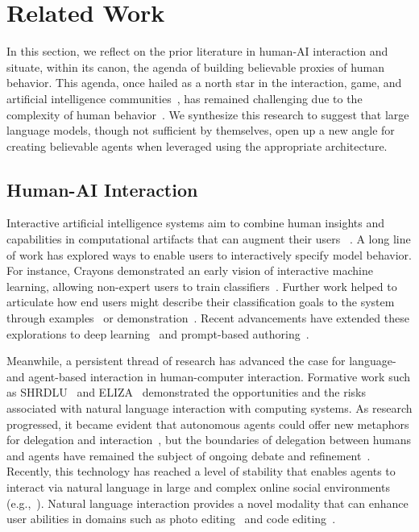 \section{Related Work}
In this section, we reflect on the prior literature in human-AI interaction and situate, within its canon, the agenda of building believable proxies of human behavior. This agenda, once hailed as a north star in the interaction, game, and artificial intelligence communities~\cite{4_laird2001human, 6_riedl2012interactive, 21_riedl2005objective, 22_bates1994role}, has remained challenging due to the complexity of human behavior~\cite{23_brooks2000cog, 25_yannakakis2012game}. We synthesize this research to suggest that large language models, though not sufficient by themselves, open up a new angle for creating believable agents when leveraged using the appropriate architecture.

\subsection{Human-AI Interaction}
Interactive artificial intelligence systems aim to combine human insights and capabilities in computational artifacts that can augment their users ~\cite{amershi2014power, fails2003interactive}. A long line of work has explored ways to enable users to interactively specify model behavior. For instance, Crayons demonstrated an early vision of interactive machine learning, allowing non-expert users to train classifiers~\cite{fails2003interactive}. Further work helped to articulate how end users might describe their classification goals to the system through examples~\cite{Fogarty2008} or demonstration~\cite{fiebrink2010wekinator}. Recent advancements have extended these explorations to deep learning~\cite{lam2023model} and prompt-based authoring~\cite{jiang_PromptMaker,62_Wu2021AIChains,liu2022opal}.

Meanwhile, a persistent thread of research has advanced the case for language- and agent-based interaction in human-computer interaction. Formative work such as SHRDLU~\cite{winograd1971procedures} and ELIZA~\cite{weizenbaum1966eliza} demonstrated the opportunities and the risks associated with natural language interaction with computing systems. As research progressed, it became evident that autonomous agents could offer new metaphors for delegation and interaction~\cite{MaesPattie1995}, but the boundaries of delegation between humans and agents have remained the subject of ongoing debate and refinement~\cite{shneiderman1997direct,horvitz1999principles,shneiderman2022human}. Recently, this technology has reached a level of stability that enables agents to interact via natural language in large and complex online social environments (e.g.,~\cite{Krishna2022}). Natural language interaction provides a novel modality that can enhance user abilities in domains such as photo editing~\cite{laput2013pixeltone, fourney2011query, adar2014command} and code editing~\cite{rong2016codemend}.

